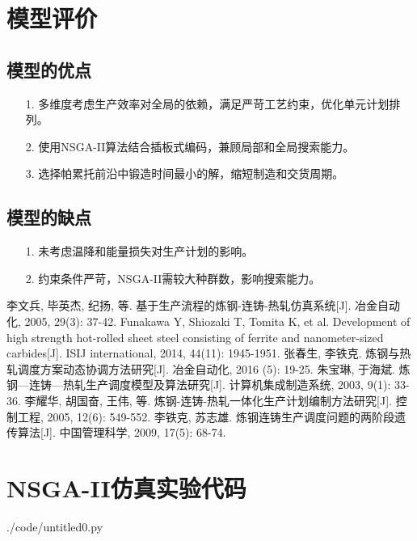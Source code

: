\documentclass{whutmod}
\begin{document}
\section{模型评价}
\subsection{模型的优点}
\begin{itemize}                                             
\item [1.]多维度考虑生产效率对全局的依赖，满足严苛工艺约束，优化单元计划排列。
\item [2.]使用NSGA-II算法结合插板式编码，兼顾局部和全局搜索能力。
\item [3.]选择帕累托前沿中锻造时间最小的解，缩短制造和交货周期。
\end{itemize}

\subsection{模型的缺点}
\begin{itemize}                                             
\item [1.]未考虑温降和能量损失对生产计划的影响。
\item [2.]约束条件严苛，NSGA-II需较大种群数，影响搜索能力。
\end{itemize}

\begin{thebibliography}{9}
李文兵, 毕英杰, 纪扬, 等. 基于生产流程的炼钢-连铸-热轧仿真系统[J]. 冶金自动化, 2005, 29(3): 37-42.
Funakawa Y, Shiozaki T, Tomita K, et al. Development of high strength hot-rolled sheet steel consisting of ferrite and nanometer-sized carbides[J]. ISIJ international, 2014, 44(11): 1945-1951.
张春生, 李铁克. 炼钢与热轧调度方案动态协调方法研究[J]. 冶金自动化, 2016 (5): 19-25.
朱宝琳, 于海斌. 炼钢—连铸—热轧生产调度模型及算法研究[J]. 计算机集成制造系统, 2003, 9(1): 33-36.
李耀华, 胡国奋, 王伟, 等. 炼钢-连铸-热轧一体化生产计划编制方法研究[J]. 控制工程, 2005, 12(6): 549-552.
李铁克, 苏志雄. 炼钢连铸生产调度问题的两阶段遗传算法[J]. 中国管理科学, 2009, 17(5): 68-74.
\end{thebibliography}

\appendix
\section{NSGA-II仿真实验代码}
 {./code/untitled0.py}
\end{document}
